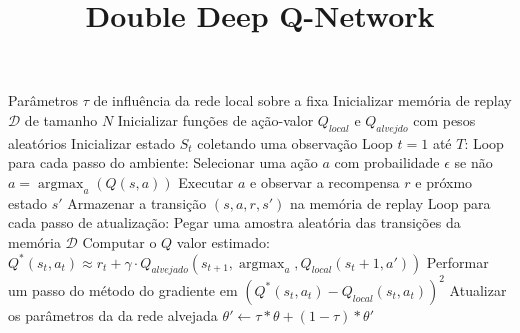 \documentclass[brazilian,preview]{standalone}
\title{Double Deep Q-Network}
\begin{document}
\begin{algorithm}
Parâmetros $\tau$ de influência da rede local sobre a fixa
Inicializar memória de replay $\mathcal{D}$ de tamanho $N$
Inicializar funções de ação-valor $Q_{local}$ e $Q_{alvejdo}$ com pesos aleatórios
Inicializar estado $S_t$ coletando uma observação
Loop $t = 1$ até $T$:
    Loop para cada passo do ambiente:
        Selecionar uma ação $a$ com probailidade $\epsilon$ se não $a = \operatorname{argmax}_a(Q(s,a))$
        Executar $a$ e observar a recompensa $r$ e próxmo estado $s'$
        Armazenar a transição $(s,a,r,s')$ na memória de replay
    Loop para cada passo de atualização:
        Pegar uma amostra aleatória das transições da memória $\mathcal{D}$
        Computar o $Q$ valor estimado:
            $Q^*(s_t,a_t) \approx r_t + \gamma \cdot Q_{alvejado}(s_{t+1}, \operatorname{argmax}_a, Q_{local}(s_t+1,a'))$
        Performar um passo do método do gradiente em $(Q^*(s_t,a_t) - Q_{local}(s_t,a_t))^2$
        Atualizar os parâmetros da da rede alvejada
            $\theta' \leftarrow \tau * \theta + (1-\tau) * \theta'$

\end{algorithm}
\end{document}
